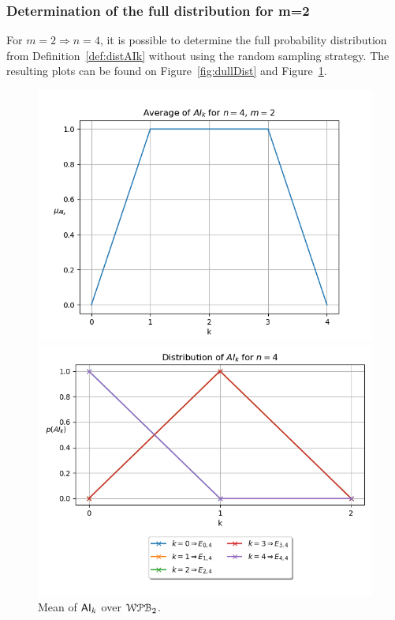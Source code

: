 \documentclass[11pt]{llncs}
\begin{document}
\subsubsection{Determination of the full distribution for \texorpdfstring{m=2}{m=2}}
For $m=2 \Rightarrow n = 4$, it is possible to determine the full probability distribution from Definition~\ref{def:distAIk} without using the random sampling strategy. 
The resulting plots can be found on Figure~\ref{fig:dullDist} and Figure~\ref{fig:averagesFullDist}. 

\begin{figure}[ht]
    \centering
    \begin{minipage}[b]{0.45\textwidth}
        \centering
        \includegraphics[width=\textwidth]{images/WPB_2_sample_size_full_dist.png}
        \caption{Mean of $\mathsf{AI}_{k}$ over $\mathcal{WPB}_{2}$.}
        \label{fig:averagesFullDist}
    \end{minipage}
    \hfill
    \begin{minipage}[b]{0.5\textwidth}
        \centering
        \includegraphics[width=\textwidth]{images/WPB_2_sample_size_full_dist_prob.png}

\end{minipage}
\end{figure}
\end{document}
